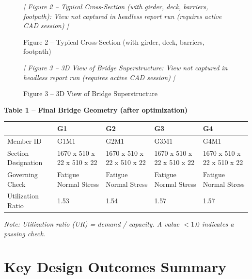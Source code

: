 \documentclass[12pt,a4paper]{report}
\numberwithin{table}{chapter}
\numberwithin{figure}{chapter}
\begin{document}
\newpage

\begin{figure}[H]
\centering
\vspace{6pt}
{\small\itshape [ Figure 2 -- Typical Cross-Section (with girder, deck, barriers, footpath): View not captured in headless report run (requires active CAD session) ]}
\vspace{6pt}
\caption*{Figure 2 -- Typical Cross-Section (with girder, deck, barriers, footpath)}
\end{figure}

\begin{figure}[H]
\centering
\vspace{6pt}
{\small\itshape [ Figure 3 -- 3D View of Bridge Superstructure: View not captured in headless report run (requires active CAD session) ]}
\vspace{6pt}
\caption*{Figure 3 -- 3D View of Bridge Superstructure}
\end{figure}

\noindent\textbf{Table 1 -- Final Bridge Geometry (after optimization)}

\vspace{0.4em}
\noindent
\begin{tabular}{|C{2.8cm}|C{3.0cm}|C{3.0cm}|C{3.0cm}|C{3.0cm}|}
\hline
  \textbf{} &
  \textbf{G1} &
  \textbf{G2} &
  \textbf{G3} &
  \textbf{G4} \\
\hline
Member ID & G1M1 & G2M1 & G3M1 & G4M1 \\
\hline
Section Designation & 1670 x 510 x 22 x 510 x 22 & 1670 x 510 x 22 x 510 x 22 & 1670 x 510 x 22 x 510 x 22 & 1670 x 510 x 22 x 510 x 22 \\
\hline
Governing Check & Fatigue Normal Stress & Fatigue Normal Stress & Fatigue Normal Stress & Fatigue Normal Stress \\
\hline
Utilization Ratio & 1.53 & 1.54 & 1.57 & 1.57 \\
\hline
\end{tabular}

\vspace{0.4em}
\noindent\textit{Note: Utilization ratio (UR) = demand / capacity. A value $< 1.0$ indicates a passing check.}

\vspace{1em}

\section*{Key Design Outcomes Summary}
\label{sec:key-outcomes}
\end{document}
